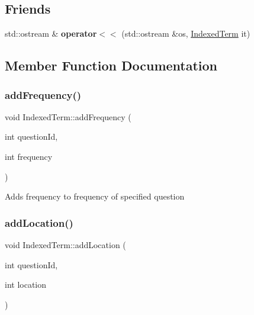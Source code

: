 \subsection*{Friends}
\begin{DoxyCompactItemize}
\item 
\mbox{\label{classIndexedTerm_a56eb771de7ee127bd3a872942ab50d55}} 
std\+::ostream \& {\bfseries operator$<$$<$} (std\+::ostream \&os, \mbox{\hyperlink{classIndexedTerm}{Indexed\+Term}} it)
\end{DoxyCompactItemize}


\subsection{Member Function Documentation}
\mbox{\label{classIndexedTerm_a34d9c26b92764dee339e754264bf6343}} 
\subsubsection{\texorpdfstring{add\+Frequency()}{addFrequency()}}
{\footnotesize\ttfamily void Indexed\+Term\+::add\+Frequency (\begin{DoxyParamCaption}\item[{int}]{question\+Id,  }\item[{int}]{frequency }\end{DoxyParamCaption})}

Adds frequency to frequency of specified question \mbox{\label{classIndexedTerm_acb1a3eebd31bfa50c78ce0371ec7d444}} 
\subsubsection{\texorpdfstring{add\+Location()}{addLocation()}}
{\footnotesize\ttfamily void Indexed\+Term\+::add\+Location (\begin{DoxyParamCaption}\item[{int}]{question\+Id,  }\item[{int}]{location }\end{DoxyParamCaption})}

